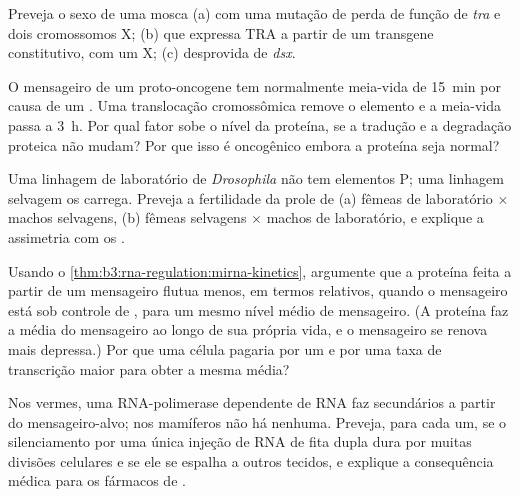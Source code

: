 \begin{exercise}[$\star\star$]\label{exo:b3:rna-regulation:7}
Preveja o sexo de uma mosca (a) com uma mutação de perda de função de
\emph{tra} e dois cromossomos X; (b) que expressa TRA a partir de um
transgene constitutivo, com um X; (c) desprovida de \emph{dsx}.
\end{exercise}

\begin{exercise}[$\star\star$]\label{exo:b3:rna-regulation:8}
O mensageiro de um proto-oncogene tem normalmente meia-vida de
\qty{15}{min} por causa de um . Uma translocação
cromossômica remove o elemento e a meia-vida passa a \qty{3}{h}. Por
qual fator sobe o nível da proteína, se a tradução e a degradação
proteica não mudam? Por que isso é oncogênico embora a proteína seja
normal?
\end{exercise}

\begin{exercise}[$\star\star$]\label{exo:b3:rna-regulation:9}
Uma linhagem de laboratório de \emph{Drosophila} não tem elementos P;
uma linhagem selvagem os carrega. Preveja a fertilidade da prole de
(a) fêmeas de laboratório $\times$ machos selvagens, (b) fêmeas
selvagens $\times$ machos de laboratório, e explique a assimetria com
os .
\end{exercise}

\begin{exercise}[$\star\star\star$]\label{exo:b3:rna-regulation:10}
Usando o \cref{thm:b3:rna-regulation:mirna-kinetics}, argumente que a
proteína feita a partir de um mensageiro flutua menos, em termos
relativos, quando o mensageiro está sob controle de , para um
mesmo nível médio de mensageiro. (A proteína faz a média do mensageiro
ao longo de sua própria vida, e o mensageiro se renova mais depressa.)
Por que uma célula pagaria por um  e por uma taxa de
transcrição maior para obter a mesma média?
\end{exercise}

\begin{exercise}[$\star\star\star$]\label{exo:b3:rna-regulation:11}
Nos vermes, uma RNA-polimerase dependente de RNA faz 
secundários a partir do mensageiro-alvo; nos mamíferos não há nenhuma.
Preveja, para cada um, se o silenciamento por uma única injeção de RNA
de fita dupla dura por muitas divisões celulares e se ele se espalha a
outros tecidos, e explique a consequência médica para os fármacos de
.
\end{exercise}

